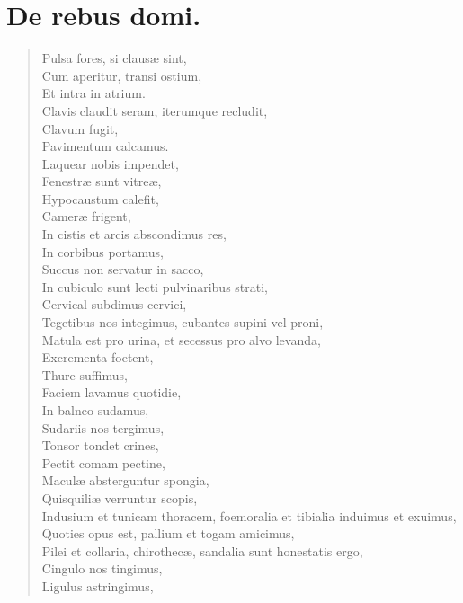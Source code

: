 \documentclass[12pt,  postvopaper]{memoir}
\begin{document}
\chapter{De rebus domi.}

\begin{verse}

  Pulsa fores, si clausæ sint,\\
  Cum aperitur, transi ostium,\\
  Et intra in atrium.\\
  Clavis claudit seram, iterumque recludit,\\
  Clavum fugit,\\
  Pavimentum calcamus. \\
  Laquear nobis impendet,\\
  Fenestræ sunt vitreæ,\\
  Hypocaustum calefit,\\
  Cameræ frigent,\\
  In cistis et arcis abscondimus res,\\
  In corbibus portamus,\\
  Succus non servatur in sacco,\\
  In cubiculo sunt lecti pulvinaribus strati, \\
  Cervical subdimus cervici,\\
  Tegetibus nos integimus, cubantes supini vel proni,\\
  Matula est pro urina, et secessus pro alvo levanda,\\
  Excrementa foetent,\\
  Thure suffimus,\\
  Faciem lavamus quotidie,\\
  In balneo sudamus,\\
  Sudariis nos tergimus,\\
  Tonsor tondet crines,\\
  Pectit comam pectine,\\
  Maculæ absterguntur spongia,\\
  Quisquiliæ verruntur scopis,\\
  Indusium et tunicam thoracem, foemoralia et tibialia induimus et exuimus,\\
  Quoties opus est, pallium et togam amicimus,\\
  Pilei et collaria, chirothecæ, sandalia sunt honestatis ergo,\\
  Cingulo nos tingimus,\\
  Ligulus astringimus,\\

\end{verse}
\end{document}
